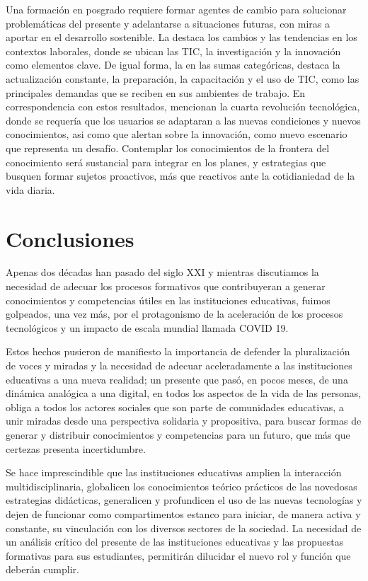 \documentclass{textolivre}
\begin{document}
Una formación en posgrado requiere formar agentes de cambio para solucionar problemáticas del presente y adelantarse a situaciones futuras, con miras a aportar en el desarrollo sostenible. La  destaca los cambios y las tendencias en los contextos laborales, donde se ubican las TIC, la investigación y la innovación como elementos clave. De igual forma, la  en las sumas categóricas, destaca la actualización constante, la preparación, la capacitación y el uso de TIC, como las principales demandas que se reciben en sus ambientes de trabajo. En correspondencia con estos resultados, \textcite{milic_implementation_2017} mencionan la cuarta revolución tecnológica, donde se requería que los usuarios se adaptaran a las nuevas condiciones y nuevos conocimientos, asi como \textcite{picatoste_new_2018} que alertan sobre la innovación, como nuevo escenario que representa un desafío. Contemplar los conocimientos de la frontera del conocimiento será sustancial para integrar en los planes, y estrategias que busquen formar sujetos proactivos, más que reactivos ante la cotidianiedad de la vida diaria.


\section{Conclusiones}\label{sec-format-simple}
Apenas dos décadas han pasado del siglo XXI y mientras discutiamos la necesidad de adecuar los procesos formativos que contribuyeran a generar conocimientos y competencias útiles en las instituciones educativas, fuimos golpeados, una vez más, por el protagonismo de la aceleración de los procesos tecnológicos y un impacto de escala mundial llamada COVID 19.  

Estos hechos pusieron de manifiesto la importancia de defender la pluralización de voces y miradas y la necesidad de adecuar aceleradamente a las instituciones educativas a una nueva realidad;  un presente que pasó, en pocos meses, de una dinámica analógica a una digital, en todos los aspectos de la vida de las personas, obliga a todos los actores sociales que son parte de comunidades educativas, a unir miradas desde una perspectiva solidaria y propositiva, para buscar formas de generar y distribuir conocimientos y competencias para un futuro, que más que certezas presenta incertidumbre.

Se hace imprescindible que las instituciones educativas amplien la interacción multidisciplinaria, globalicen los conocimientos teórico prácticos de las novedosas estrategias didácticas, generalicen y profundicen el uso de las nuevas tecnologías y dejen de funcionar como compartimentos estanco para iniciar, de manera activa y constante, su vinculación con los diversos sectores de la sociedad. La necesidad de un análisis crítico del presente de las instituciones educativas y las propuestas formativas para sus estudiantes, permitirán dilucidar el nuevo rol y función que deberán cumplir.
\end{document}
